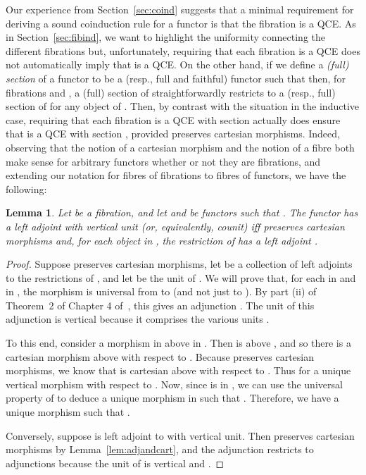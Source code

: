 \documentclass{LMCS}
\theoremstyle{plain}
\newtheorem{lemma}[theorem]{Lemma}
\theoremstyle{remark}
\theoremstyle{definition}
\begin{document}
Our experience from Section~\ref{sec:coind} suggests that a minimal
requirement for deriving a sound coinduction rule for a functor
 is that the fibration  is a QCE.  As in
Section~\ref{sec:fibind}, we want to highlight the uniformity
connecting the different fibrations  but, unfortunately,
requiring that each fibration  is a QCE does not automatically
imply that  is a QCE. On the other hand, if we define a
\emph{(full) section} of a functor  to be a (resp., full
and faithful) functor  such that  then, for
fibrations  and , a (full) section 
of  straightforwardly restricts to a (resp., full) section
 of  for any object  of . Then, by
contrast with the situation in the inductive case, requiring that each
fibration  is a QCE with section  actually does ensure that
 is a QCE with section , provided  preserves cartesian
morphisms. Indeed, observing that the notion of a cartesian morphism
and the notion of a fibre both make sense for arbitrary functors
whether or not they are fibrations, and extending our notation for
fibres of fibrations to fibres of functors, we have the following:

\begin{lemma}\label{lem:weakfibadj}
  Let  be a fibration, and let  and 
  be functors such that . The functor  has a left adjoint
   with vertical unit (or, equivalently, counit) iff 
  preserves cartesian morphisms and, for each object  in , the
  restriction  of  has a left adjoint .
\end{lemma}
\begin{proof}
  Suppose  preserves cartesian morphisms, let  be
  a collection of left adjoints to the restrictions 
  of , and let  be the unit of .  We will
  prove that, for each  in  and  in , the morphism
   is universal from  to  (and not just to
  ). By part (ii) of Theorem~2 of Chapter 4 of~\cite{mac71}, this
  gives an adjunction . The unit of this adjunction is
  vertical because it comprises the various units .

  To this end, consider a morphism  in  above  in .  Then  is above , and so there is a cartesian
  morphism  above  with respect to . Because
   preserves cartesian morphisms, we know that  is
  cartesian above  with respect to . Thus  for
  a unique vertical morphism  with respect to
  . Now, since  is in , we can use the universal property
  of  to deduce a unique morphism  in 
  such that . Therefore, we have a unique morphism
   such that .

  Conversely, suppose  is left adjoint to  with vertical unit.
  Then  preserves cartesian morphisms by
  Lemma~\ref{lem:adjandcart}, and the adjunction 
  restricts to adjunctions  because the unit of  is vertical and .
\end{proof}
\end{document}
